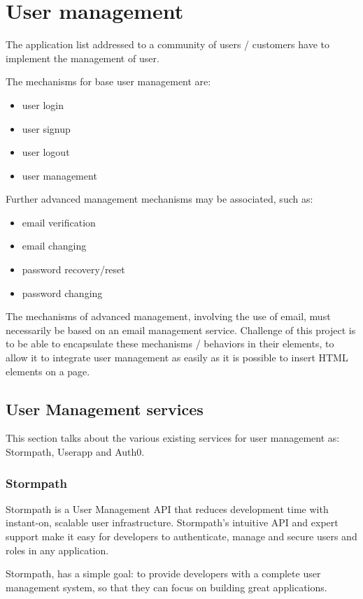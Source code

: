 \section{User management}
\label{sec:USR_user_management}

The application list addressed to a community of users / customers have to implement the management of user.

The mechanisms for base user management are:
\begin{itemize}
\item user login 
\item user signup
\item user logout
\item user management
\end{itemize}
Further advanced management mechanisms may be associated, such as:
\begin{itemize}
\item email verification 
\item email changing  
\item password recovery/reset 
\item password changing  
\end{itemize}

The mechanisms of advanced management, involving the use of email, must necessarily be based on an email management service.
Challenge of this project is to be able to encapsulate these mechanisms / behaviors in their elements, to allow it to integrate user management as easily as it is possible to insert HTML elements on a page.

\subsection{User Management services}
\label{subsec:USR_user_management_services}
This section talks about the various existing services for user management as: Stormpath, Userapp and Auth0.
\subsubsection{Stormpath}

Stormpath is a User Management API that reduces development time with instant-on, scalable user infrastructure. Stormpath's intuitive API and expert support make it easy for developers to authenticate, manage and secure users and roles in any application.

Stormpath, has a simple goal: to provide developers with a complete user management system, so that they can focus on building great applications.\cite{usr_stormpath}

